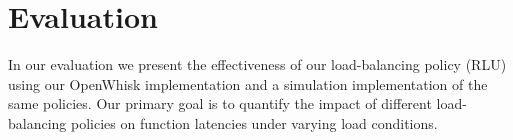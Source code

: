\vspace*{-0.2cm}
\section{Evaluation}
\label{sec:eval}
In our evaluation we present the effectiveness of our load-balancing policy (RLU) using our OpenWhisk implementation and a simulation implementation of the same policies. 
Our primary goal is to quantify the impact of different load-balancing policies on function latencies under varying load conditions. 



